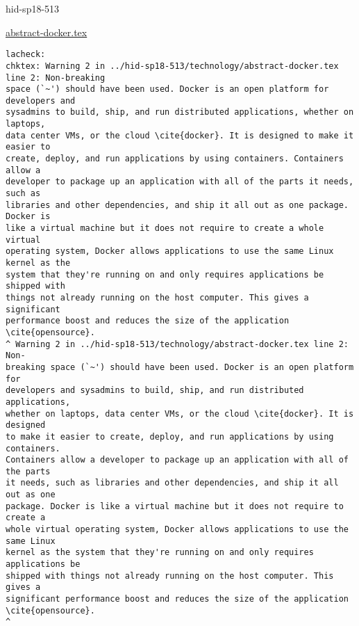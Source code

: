 

\begin{IU}

hid-sp18-513

\href{https://github.com/cloudmesh-community/hid-sp18-513/blob/master//technology/abstract-docker.tex}{abstract-docker.tex}

\begin{tiny}
\begin{verbatim}
lacheck: 
chktex: Warning 2 in ../hid-sp18-513/technology/abstract-docker.tex line 2: Non-breaking
space (`~') should have been used. Docker is an open platform for developers and
sysadmins to build, ship, and run distributed applications, whether on laptops,
data center VMs, or the cloud \cite{docker}. It is designed to make it easier to
create, deploy, and run applications by using containers. Containers allow a
developer to package up an application with all of the parts it needs, such as
libraries and other dependencies, and ship it all out as one package. Docker is
like a virtual machine but it does not require to create a whole virtual
operating system, Docker allows applications to use the same Linux kernel as the
system that they're running on and only requires applications be shipped with
things not already running on the host computer. This gives a significant
performance boost and reduces the size of the application \cite{opensource}.
^ Warning 2 in ../hid-sp18-513/technology/abstract-docker.tex line 2: Non-
breaking space (`~') should have been used. Docker is an open platform for
developers and sysadmins to build, ship, and run distributed applications,
whether on laptops, data center VMs, or the cloud \cite{docker}. It is designed
to make it easier to create, deploy, and run applications by using containers.
Containers allow a developer to package up an application with all of the parts
it needs, such as libraries and other dependencies, and ship it all out as one
package. Docker is like a virtual machine but it does not require to create a
whole virtual operating system, Docker allows applications to use the same Linux
kernel as the system that they're running on and only requires applications be
shipped with things not already running on the host computer. This gives a
significant performance boost and reduces the size of the application
\cite{opensource}.
^
\end{verbatim}
\end{tiny}
\end{IU}


